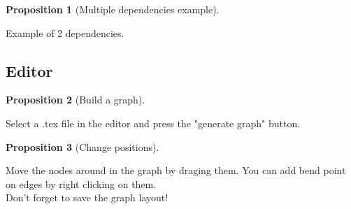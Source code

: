 \documentclass{article}
\theoremstyle{definition}
\newtheorem{proposition}{Proposition}
\newcommand{\depends}[1]{}
\newcommand{\summary}[1]{}
\newcommand{\mainText}[1]{#1}
\begin{document}
\begin{proposition}[Multiple dependencies example]
    \label{prop:multi-dep}
    \depends{prop:create-node,prop:add-dependency}
    \summary{
        Example of 2 dependencies.
    }
    \mainText{
        Example of 2 dependencies.
    }
\end{proposition}

\subsection{Editor}
\label{subsec:editor}

\begin{proposition}[Build a graph]
    \label{prop:build-a-graph}
    \summary{
        Select a .tex file in the editor and press the "generate graph" button. The graph is saved in a different file: graph_with_pos_TEX_FILENAME.txt. It containes the position of the nodes.
    }
    \mainText{
        Select a .tex file in the editor and press the "generate graph" button.
    }
\end{proposition}

\begin{proposition}[Change positions]
    \label{prop:change-pos}
    \depends{prop:build-a-graph}
    \summary{
        Move the nodes around in the graph by draging them. You can add bend point on edges by right clicking on them.\\
        Don't forget to save the graph layout! 
    }
    \mainText{
        Move the nodes around in the graph by draging them. You can add bend point on edges by right clicking on them.\\
        Don't forget to save the graph layout! 
    }
\end{proposition}
\end{document}
